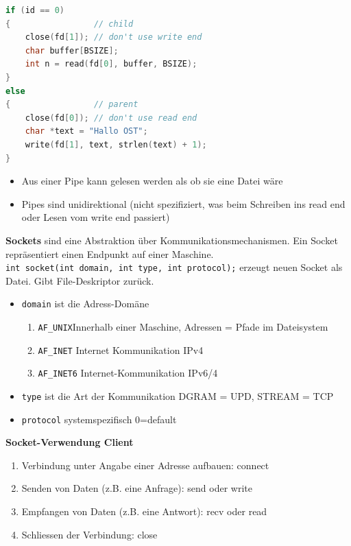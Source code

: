 \documentclass[8pt]{extarticle}
\let\oldtextbf\textbf
\renewcommand{\textbf}{\tiny\oldtextbf}
\begin{document}
\begin{multicols*}{5}
\begin{lstlisting}[language=c]
if (id == 0)
{                 // child
    close(fd[1]); // don't use write end
    char buffer[BSIZE];
    int n = read(fd[0], buffer, BSIZE);
}
else
{                 // parent
    close(fd[0]); // don't use read end
    char *text = "Hallo OST";
    write(fd[1], text, strlen(text) + 1);
}
	\end{lstlisting} 
	\begin{itemize}[noitemsep, topsep=0pt, leftmargin=*]
		\item Aus einer Pipe kann gelesen werden als ob sie eine Datei wäre
		\item Pipes sind unidirektional (nicht spezifiziert, was beim Schreiben ins read end oder Lesen vom write end passiert)
	\end{itemize}
	\vspace{5pt}
	\textbf{Sockets} sind eine Abstraktion über Kommunikationsmechanismen. Ein Socket repräsentiert einen Endpunkt auf einer Maschine.\\
	\texttt{int socket(int domain, int type, int protocol);} erzeugt neuen Socket als Datei. Gibt File-Deskriptor zurück.
	\begin{itemize}[noitemsep, topsep=0pt, leftmargin=*]
		\item \texttt{domain} ist die Adress-Domäne
		\begin{enumerate} [noitemsep, topsep=0pt, leftmargin=*]
			\item \texttt{AF\_UNIX}Innerhalb einer Maschine, Adressen = Pfade im Dateisystem
			\item \texttt{AF\_INET} Internet Kommunikation IPv4
			\item \texttt{AF\_INET6} Internet-Kommunikation IPv6/4
		\end{enumerate}
		\item \texttt{type} ist die Art der Kommunikation DGRAM = UPD, STREAM = TCP
		\item \texttt{protocol} systemspezifisch 0=default
	\end{itemize}
	\vspace{5pt}
	\textbf{Socket-Verwendung Client}
	\begin{enumerate} [noitemsep, topsep=0pt, leftmargin=*]
		\item Verbindung unter Angabe einer Adresse aufbauen: connect
		\item Senden von Daten (z.B. eine Anfrage): send oder write
		\item Empfangen von Daten (z.B. eine Antwort): recv oder read
		\item Schliessen der Verbindung: close
	\end{enumerate}
	

\end{multicols*}
\end{document}
